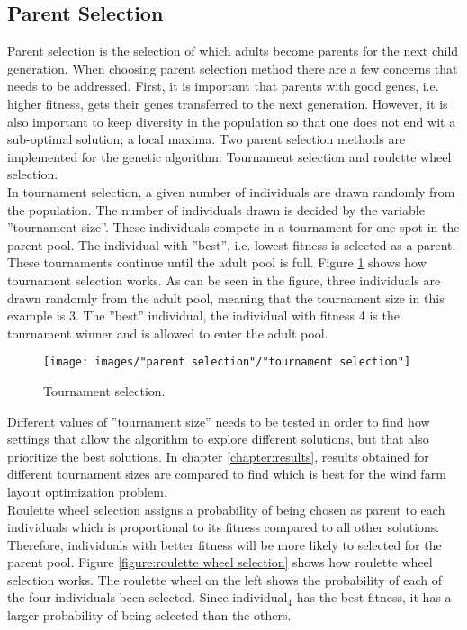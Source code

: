 \subsection{Parent Selection}\label{subsection:parent selection}
Parent selection is the selection of which adults become parents for the next child generation. When choosing parent selection method there are a few concerns that needs to be addressed. First, it is important that parents with good genes, i.e. higher fitness, gets their genes transferred to the next generation. However, it is also important to keep diversity in the population so that one does not end wit a sub-optimal solution; a local maxima. Two parent selection methods are implemented for the genetic algorithm: Tournament selection and roulette wheel selection. \\

\noindent In tournament selection, a given number of individuals are drawn randomly from the population. The number of individuals drawn is decided by the variable ''tournament size''. These individuals compete in a tournament for one spot in the parent pool. The individual with ''best'', i.e. lowest fitness is selected as a parent. These tournaments continue until the adult pool is full. Figure \ref{figure:tournament selection} shows how tournament selection works. As can be seen in the figure, three individuals are drawn randomly from the adult pool, meaning that the tournament size in this example is 3. The ''best'' individual, the individual with fitness 4 is the tournament winner and is allowed to enter the adult pool. \\


\begin{figure}[h!]
\begin{center}
\texttt{[image: images/"parent selection"/"tournament selection"]}
\caption{Tournament selection.}
\label{figure:tournament selection}
\end{center}
\end{figure}


\noindent Different values of ''tournament size'' needs to be tested in order to find how settings that allow the algorithm to explore different solutions, but that also prioritize the best solutions. In chapter \ref{chapter:results}, results obtained for different tournament sizes are compared to find which is best for the wind farm layout optimization problem. \\


\noindent Roulette wheel selection assigns a probability of being chosen as parent to each individuals which is proportional to its fitness compared to all other solutions. Therefore, individuals with better fitness will be more likely to selected for the parent pool. Figure \ref{figure:roulette wheel selection} shows how roulette wheel selection works. The roulette wheel on the left shows the probability of each of the four individuals been selected. Since individual$_4$ has the best fitness, it has a larger probability of being selected than the others. \\


